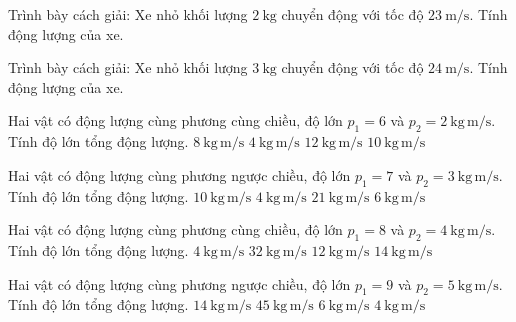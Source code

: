 \begin{bt}
Trình bày cách giải: Xe nhỏ khối lượng $2\ \mathrm{kg}$ chuyển động với tốc độ $23\ \mathrm{m/s}$. Tính động lượng của xe.
\end{bt}

\begin{bt}
Trình bày cách giải: Xe nhỏ khối lượng $3\ \mathrm{kg}$ chuyển động với tốc độ $24\ \mathrm{m/s}$. Tính động lượng của xe.
\end{bt}

\begin{ex}
Hai vật có động lượng cùng phương cùng chiều, độ lớn $p_1=6$ và $p_2=2\ \mathrm{kg\,m/s}$. Tính độ lớn tổng động lượng.
\choice
{\True $8\ \mathrm{kg\,m/s}$}
{$4\ \mathrm{kg\,m/s}$}
{$12\ \mathrm{kg\,m/s}$}
{$10\ \mathrm{kg\,m/s}$}
\end{ex}

\begin{ex}
Hai vật có động lượng cùng phương ngược chiều, độ lớn $p_1=7$ và $p_2=3\ \mathrm{kg\,m/s}$. Tính độ lớn tổng động lượng.
\choice
{$10\ \mathrm{kg\,m/s}$}
{\True $4\ \mathrm{kg\,m/s}$}
{$21\ \mathrm{kg\,m/s}$}
{$6\ \mathrm{kg\,m/s}$}
\end{ex}

\begin{ex}
Hai vật có động lượng cùng phương cùng chiều, độ lớn $p_1=8$ và $p_2=4\ \mathrm{kg\,m/s}$. Tính độ lớn tổng động lượng.
\choice
{$4\ \mathrm{kg\,m/s}$}
{$32\ \mathrm{kg\,m/s}$}
{\True $12\ \mathrm{kg\,m/s}$}
{$14\ \mathrm{kg\,m/s}$}
\end{ex}

\begin{ex}
Hai vật có động lượng cùng phương ngược chiều, độ lớn $p_1=9$ và $p_2=5\ \mathrm{kg\,m/s}$. Tính độ lớn tổng động lượng.
\choice
{$14\ \mathrm{kg\,m/s}$}
{$45\ \mathrm{kg\,m/s}$}
{$6\ \mathrm{kg\,m/s}$}
{\True $4\ \mathrm{kg\,m/s}$}
\end{ex}

